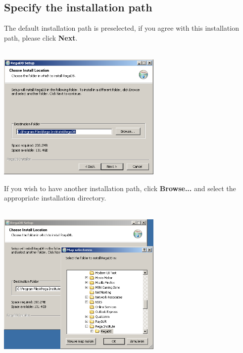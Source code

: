 \subsection{Specify the installation path}
The default installation path is preselected, if you agree with this installation path, please click \textbf{Next}.
\\
\vspace{0.5cm}~ \\ \centerline{\includegraphics[width=8cm] {pics/nsis/installation_path_4.png}}
If you wish to have another installation path, click \textbf{Browse...} and select the appropriate installation directory.
\\
\vspace{0.5cm}~ \\ \centerline{\includegraphics[width=8cm] {pics/nsis/installation_path_5.png}}


